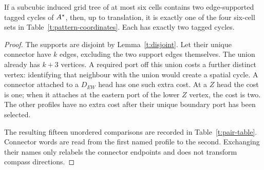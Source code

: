 \begin{lemma}\label{t:four-patterns}
If a subcubic induced grid tree of at most six cells contains two
edge-supported tagged cycles of \(A^{\star}\), then, up to translation,
it is exactly one of the four six-cell sets in
Table~\ref{t:pattern-coordinates}. Each has exactly two tagged cycles.
\end{lemma}
\begin{proof}
The supports are disjoint by Lemma~\ref{t:disjoint}. Let their unique
connector have \(k\) edges, excluding the two support edges themselves.
The union already has \(k+3\) vertices. A required port off this union
costs a further distinct vertex: identifying that neighbour with the
union would create a spatial cycle. A connector attached to a
\(D_{EW}\) head has one such extra cost. At a \(Z\) head the cost is
one; when it attaches at the eastern port of the lower \(Z\) vertex,
the cost is two. The other profiles have no extra cost after their
unique boundary port has been selected.

The resulting fifteen unordered comparisons are recorded in
Table~\ref{t:pair-table}. Connector words are read from the first named
profile to the second. Exchanging their names only relabels the
connector endpoints and does not transform compass directions.


\end{proof}
